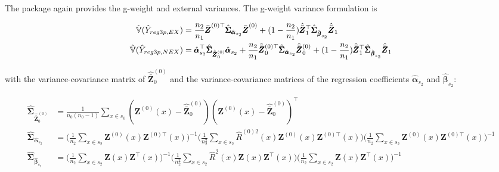 The package again provides the g-weight and external variances. The g-weight variance formulation is

\begin{subequations}\label{eq:dbvar_reg3p}
\begin{align}
\hat{\mathbb{V}}(\hat{Y}_{reg3p,EX})& =\frac{n_2}{n_1}\bar{\pmb{Z}}^{(0)\top}\hat{\pmb{\Sigma}}_{\hat{\pmb{\alpha}}_{s_2}}
\bar{\pmb{Z}}^{(0)}+(1-\frac{n_2}{n_1})\hat{\bar{\pmb{Z}}}_1^{\top}\hat{\pmb{\Sigma}}_{\hat{\pmb{\beta}}_{s_2}}
\hat{\bar{\pmb{Z}}}_1 \label{eq:dbvar_reg3p_ex} \\
\hat{\mathbb{V}}(\hat{Y}_{reg3p,NEX})& =\hat{\pmb{\alpha}}_{s_2} ^{\top}\hat{\pmb{\Sigma}}_{\hat{\bar{\pmb{Z}}}^{(0)}_0}\hat{\pmb{\alpha}}_{s_2}
+\frac{n_2}{n_1}\hat{\bar{\pmb{Z}}}^{(0)\top}_0
\hat{\pmb{\Sigma}}_{\hat{\pmb{\alpha}}_{s_2}}\hat{\bar{\pmb{Z}}}^{(0)}_0 + (1-\frac{n_2}{n_1})\hat{\bar{\pmb{Z}}}^{\top}_1\hat{\pmb{\Sigma}}_{\hat{\pmb{\beta}}_{s_2}}\hat{\bar{\pmb{Z}}}_1 \label{eq:dbvar_reg3p_nex}
\end{align}
\end{subequations}

with the variance-covariance matrix of $\hat{\bar{\pmb{Z}}}^{(0)}_0$ and the variance-covariance matrices of the regression coefficients $\hat{\pmb{\alpha}}_{s_2}$ and $\hat{\pmb{\beta}}_{s_2}$:

\begin{subequations}\label{eq:covar3p}
\begin{align}
  \hat{\pmb{\Sigma}}_{\hat{\bar{\pmb{Z}}}^{(0)}_0}&=
  \frac{1}{n_{0}(n_{0}-1)}\sum_{x\in{s_{0}}}
  (\pmb{Z}^{(0)}(x)-\hat{\bar{\pmb{Z}}}^{(0)}_{0})(\pmb{Z}^{(0)}(x)-\hat{\bar{\pmb{Z}}}^{(0)}_{0})^{\top} \\
  \hat{\pmb{\Sigma}}_{\hat{\pmb{\alpha}}_{s_2}}&=\Big(\frac{1}{n_2}\sum_{x\in{s_2}}\pmb{Z}^{(0)}(x)\pmb{Z}^{(0)\top}(x) \Big)^{-1}
  \Big(\frac{1}{n_2^2}\sum_{x\in{s_2}}\hat{R}^{(0)2}(x)\pmb{Z}^{(0)}(x)\pmb{Z}^{(0)\top}(x)\Big)
  \Big(\frac{1}{n_2}\sum_{x\in{s_2}}\pmb{Z}^{(0)}(x)\pmb{Z}^{(0)\top}(x) \Big)^{-1} \label{eq:covar_alpha} \\
  \hat{\pmb{\Sigma}}_{\hat{\pmb{\beta}}_{s_2}}&=\Big(\frac{1}{n_2}\sum_{x\in{s_2}}\pmb{Z}(x)\pmb{Z}^{\top}(x) \Big)^{-1}
  \Big(\frac{1}{n_2^2}\sum_{x\in{s_2}}\hat{R}^2(x)\pmb{Z}(x)\pmb{Z}^{\top}(x)\Big)
  \Big(\frac{1}{n_2}\sum_{x\in{s_2}}\pmb{Z}(x)\pmb{Z}^{\top}(x) \Big)^{-1} \label{eq:covar_beta}
\end{align}
\end{subequations}

